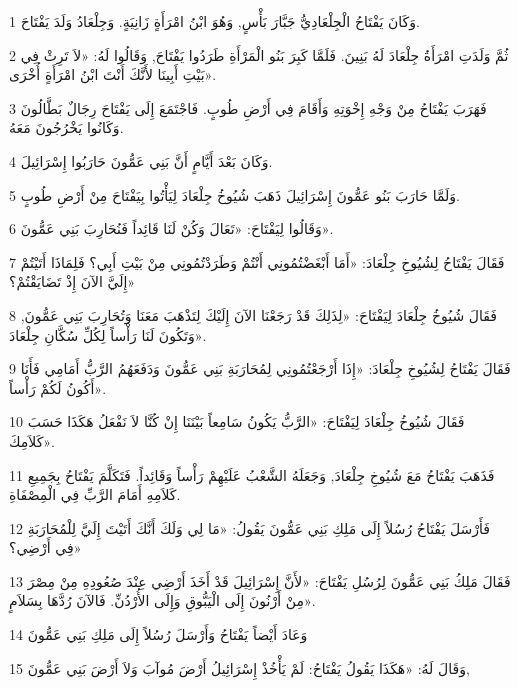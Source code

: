 \par 1 وَكَانَ يَفْتَاحُ الْجِلْعَادِيُّ جَبَّارَ بَأْسٍ, وَهُوَ ابْنُ امْرَأَةٍ زَانِيَةٍ. وَجِلْعَادُ وَلَدَ يَفْتَاحَ.
\par 2 ثُمَّ وَلَدَتِ امْرَأَةُ جِلْعَادَ لَهُ بَنِينَ. فَلَمَّا كَبِرَ بَنُو الْمَرْأَةِ طَرَدُوا يَفْتَاحَ, وَقَالُوا لَهُ: «لاَ تَرِثْ فِي بَيْتِ أَبِينَا لأَنَّكَ أَنْتَ ابْنُ امْرَأَةٍ أُخْرَى».
\par 3 فَهَرَبَ يَفْتَاحُ مِنْ وَجْهِ إِخْوَتِهِ وَأَقَامَ فِي أَرْضِ طُوبٍ. فَاجْتَمَعَ إِلَى يَفْتَاحَ رِجَالٌ بَطَّالُونَ وَكَانُوا يَخْرُجُونَ مَعَهُ.
\par 4 وَكَانَ بَعْدَ أَيَّامٍ أَنَّ بَنِي عَمُّونَ حَارَبُوا إِسْرَائِيلَ.
\par 5 وَلَمَّا حَارَبَ بَنُو عَمُّونَ إِسْرَائِيلَ ذَهَبَ شُيُوخُ جِلْعَادَ لِيَأْتُوا بِيَفْتَاحَ مِنْ أَرْضِ طُوبٍ.
\par 6 وَقَالُوا لِيَفْتَاحَ: «تَعَالَ وَكُنْ لَنَا قَائِداً فَنُحَارِبَ بَنِي عَمُّونَ».
\par 7 فَقَالَ يَفْتَاحُ لِشُيُوخِ جِلْعَادَ: «أَمَا أَبْغَضْتُمُونِي أَنْتُمْ وَطَرَدْتُمُونِي مِنْ بَيْتِ أَبِي؟ فَلِمَاذَا أَتَيْتُمْ إِلَيَّ الآنَ إِذْ تَضَايَقْتُمْ؟»
\par 8 فَقَالَ شُيُوخُ جِلْعَادَ لِيَفْتَاحَ: «لِذَلِكَ قَدْ رَجَعْنَا الآنَ إِلَيْكَ لِتَذْهَبَ مَعَنَا وَتُحَارِبَ بَنِي عَمُّونَ, وَتَكُونَ لَنَا رَأْساً لِكُلِّ سُكَّانِ جِلْعَادَ».
\par 9 فَقَالَ يَفْتَاحُ لِشُيُوخِ جِلْعَادَ: «إِذَا أَرْجَعْتُمُونِي لِمُحَارَبَةِ بَنِي عَمُّونَ وَدَفَعَهُمُ الرَّبُّ أَمَامِي فَأَنَا أَكُونُ لَكُمْ رَأْساً».
\par 10 فَقَالَ شُيُوخُ جِلْعَادَ لِيَفْتَاحَ: «الرَّبُّ يَكُونُ سَامِعاً بَيْنَنَا إِنْ كُنَّا لاَ نَفْعَلُ هَكَذَا حَسَبَ كَلاَمِكَ».
\par 11 فَذَهَبَ يَفْتَاحُ مَعَ شُيُوخِ جِلْعَادَ, وَجَعَلَهُ الشَّعْبُ عَلَيْهِمْ رَأْساً وَقَائِداً. فَتَكَلَّمَ يَفْتَاحُ بِجَمِيعِ كَلاَمِهِ أَمَامَ الرَّبِّ فِي الْمِصْفَاةِ.
\par 12 فَأَرْسَلَ يَفْتَاحُ رُسُلاً إِلَى مَلِكِ بَنِي عَمُّونَ يَقُولُ: «مَا لِي وَلَكَ أَنَّكَ أَتَيْتَ إِلَيَّ لِلْمُحَارَبَةِ فِي أَرْضِي؟»
\par 13 فَقَالَ مَلِكُ بَنِي عَمُّونَ لِرُسُلِ يَفْتَاحَ: «لأَنَّ إِسْرَائِيلَ قَدْ أَخَذَ أَرْضِي عِنْدَ صُعُودِهِ مِنْ مِصْرَ مِنْ أَرْنُونَ إِلَى الْيَبُّوقِ وَإِلَى الأُرْدُنِّ. فَالآنَ رُدَّهَا بِسَلاَمٍ».
\par 14 وَعَادَ أَيْضاً يَفْتَاحُ وَأَرْسَلَ رُسُلاً إِلَى مَلِكِ بَنِي عَمُّونَ
\par 15 وَقَالَ لَهُ: «هَكَذَا يَقُولُ يَفْتَاحُ: لَمْ يَأْخُذْ إِسْرَائِيلُ أَرْضَ مُوآبَ وَلاَ أَرْضَ بَنِي عَمُّونَ,
